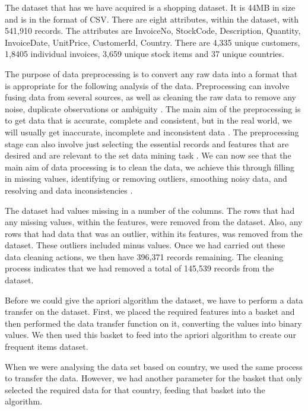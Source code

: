 \documentclass[a4paper,10pt]{article}
\begin{document}
The dataset that has we have acquired is a shopping dataset. It is 44MB in size and is in the format of CSV. There are eight attributes, within the dataset, with 541,910 records. The attributes are InvoiceNo, StockCode, Description, Quantity, InvoiceDate, UnitPrice, CustomerId, Country. There are 4,335 unique customers, 1,8405 individual invoices, 3,659 unique stock items and 37 unique countries.

The purpose of data preprocessing is to convert any raw data into a format that is appropriate for the following analysis of the data. Preprocessing can involve fusing data from several sources, as well as cleaning the raw data to remove any noise, duplicate observations or ambiguity \cite{tan2016introduction}. The main aim of the preprocessing is to get data that is accurate, complete and consistent, but in the real world, we will usually get inaccurate, incomplete and inconsistent data \cite{han2011data}. The preprocessing stage can also involve just selecting the essential records and features that are desired and are relevant to the set data mining task \cite{tan2016introduction}. We can now see that the main aim of data processing is to clean the data, we achieve this through filling in missing values, identifying or removing outliers, smoothing noisy data, and resolving and data inconsistencies \cite{han2011data}.

The dataset had values missing in a number of the columns. The rows that had any missing values, within the features, were removed from the dataset. Also, any rows that had data that was an outlier, within its features, was removed from the dataset. These outliers included minus values. Once we had carried out these data cleaning actions, we then have 396,371 records remaining. The cleaning process indicates that we had removed a total of 145,539 records from the dataset. 

Before we could give the apriori algorithm the dataset, we have to perform a data transfer on the dataset. First, we placed the required features into a basket and then performed the data transfer function on it, converting the values into binary values. We then used this basket to feed into the apriori algorithm to create our frequent items dataset.

When we were analysing the data set based on country, we used the same process to transfer the data. However, we had another parameter for the basket that only selected the required data for that country, feeding that basket into the algorithm.
\end{document}
